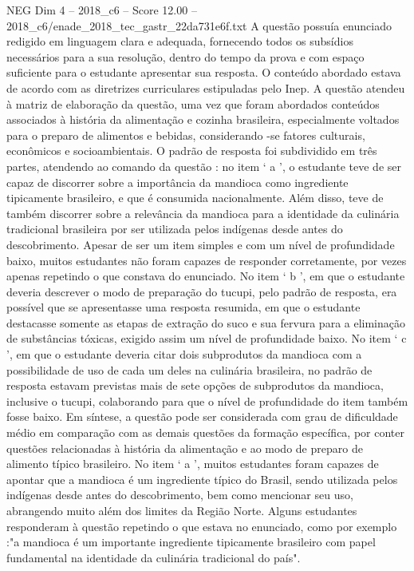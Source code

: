 \begin{textsample}{NEG Dim 4 – 2018\_c6 – Score 12.00 – 2018\_c6/enade\_2018\_tec\_gastr\_22da731e6f.txt}
A questão possuía enunciado redigido em linguagem clara e adequada, fornecendo todos os subsídios necessários para a sua resolução, dentro do tempo da prova e com espaço suficiente para o estudante apresentar sua resposta.
O conteúdo abordado estava de acordo com as diretrizes curriculares estipuladas pelo Inep.
A questão atendeu à matriz de elaboração da questão, uma vez que foram abordados conteúdos associados à história da alimentação e cozinha brasileira, especialmente voltados para o preparo de alimentos e bebidas, considerando -se fatores culturais, econômicos e socioambientais.
O padrão de resposta foi subdividido em três partes, atendendo ao comando da questão : no item ‘ a ’, o estudante teve de ser capaz de discorrer sobre a importância da mandioca como ingrediente tipicamente brasileiro, e que é consumida nacionalmente.
Além disso, teve de também discorrer sobre a relevância da mandioca para a identidade da culinária tradicional brasileira por ser utilizada pelos indígenas desde antes do descobrimento.
Apesar de ser um item simples e com um nível de profundidade baixo, muitos estudantes não foram capazes de responder corretamente, por vezes apenas repetindo o que constava do enunciado.
No item ‘ b ’, em que o estudante deveria descrever o modo de preparação do tucupi, pelo padrão de resposta, era possível que se apresentasse uma resposta resumida, em que o estudante destacasse somente as etapas de extração do suco e sua fervura para a eliminação de substâncias tóxicas, exigido assim um nível de profundidade baixo.
No item ‘ c ’, em que o estudante deveria citar dois subprodutos da mandioca com a possibilidade de uso de cada um deles na culinária brasileira, no padrão de resposta estavam previstas mais de sete opções de subprodutos da mandioca, inclusive o tucupi, colaborando para que o nível de profundidade do item também fosse baixo.
Em síntese, a questão pode ser considerada com grau de dificuldade médio em comparação com as demais questões da formação específica, por conter questões relacionadas à história da alimentação e ao modo de preparo de alimento típico brasileiro.
No item ‘ a ’, muitos estudantes foram capazes de apontar que a mandioca é um ingrediente típico do Brasil, sendo utilizada pelos indígenas desde antes do descobrimento, bem como mencionar seu uso, abrangendo muito além dos limites da Região Norte.
Alguns estudantes responderam à questão repetindo o que estava no enunciado, como por exemplo :"a mandioca é um importante ingrediente tipicamente brasileiro com papel fundamental na identidade da culinária tradicional do país".

\end{textsample}
